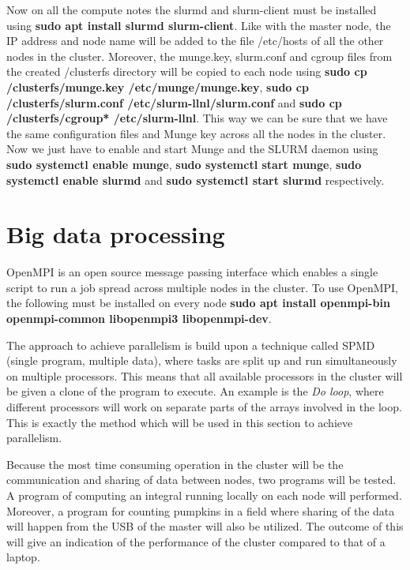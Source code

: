 \documentclass[../Head/Report.tex]{subfiles}
\begin{document}
Now on all the compute notes the slurmd and slurm-client must be installed using \textbf{sudo apt install slurmd slurm-client}. Like with the master node, the IP address and node name will be added to the file /etc/hosts of all the other nodes in the cluster. Moreover, the munge.key, slurm.conf and cgroup files from the created /clusterfs directory will be copied to each node using \textbf{sudo cp /clusterfs/munge.key /etc/munge/munge.key}, \textbf{sudo cp /clusterfs/slurm.conf /etc/slurm-llnl/slurm.conf} and \textbf{sudo cp /clusterfs/cgroup* /etc/slurm-llnl}. This way we can be sure that we have the same configuration files and Munge key across all the nodes in the cluster. Now we just have to enable and start Munge and the SLURM daemon using \textbf{sudo systemctl enable munge}, \textbf{sudo systemctl start munge}, \textbf{sudo systemctl enable slurmd} and \textbf{sudo systemctl start slurmd} respectively.

\section{Big data processing}

OpenMPI is an open source message passing interface which enables a single script to run a job spread across multiple nodes in the cluster. To use OpenMPI, the following must be installed on every node \textbf{sudo apt install openmpi-bin openmpi-common libopenmpi3 libopenmpi-dev}. 

The approach to achieve parallelism is build upon a technique called SPMD (single program, multiple data), where tasks are split up and run simultaneously on multiple processors. This means that all available processors in the cluster will be given a clone of the program to execute. An example is the \textit{Do loop}, where different processors will work on separate parts of the arrays involved in the loop. This is exactly the method which will be used in this section to achieve parallelism.\cite{SPMD}    

Because the most time consuming operation in the cluster will be the communication and sharing of data between nodes, two programs will be tested. A program of computing an integral running locally on each node will performed. Moreover, a program for counting pumpkins in a field where sharing of the data will happen from the USB of the master will also be utilized. The outcome of this will give an indication of the performance of the cluster compared to that of a laptop.     
\end{document}

